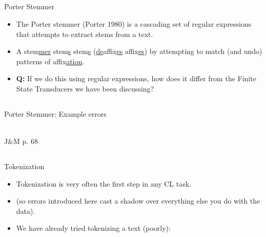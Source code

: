 \documentclass[9pt,xcolor=pdftex,dvipsnames,table]{beamer}
\begin{document}
\subsection{}
\begin{frame}{Porter Stemmer}

\begin{itemize}
     \item The Porter stemmer (Porter 1980) is a cascading set of regular expressions that attempts to extract stems from a text.
     \item A stem\underline{mer} stem\underline{s} stem\underline{s} (\underline{de}affix\underline{es} affix\underline{es}) by attempting to match (and undo) patterns of affix\underline{ation}.\pause
     \item \textbf{Q:} If we do this using regular expressions, how does it differ from the Finite State Transducers we have been discussing? 
\end{itemize}
\end{frame}

\subsection{}
\begin{frame}{Porter Stemmer: Example errors}
\begin{center}
	\\
	{\large J\&M p. 68}\\
\end{center}
\end{frame}

\subsection{}
\begin{frame}{Tokenization}

\begin{itemize}
     \item Tokenization is very often the first step in any CL task.
     \item (so errors introduced here cast a shadow over everything else you do with the data).
     \item We have already tried tokenizing a text (poorly):
\end{itemize}
\end{frame}
\end{document}
